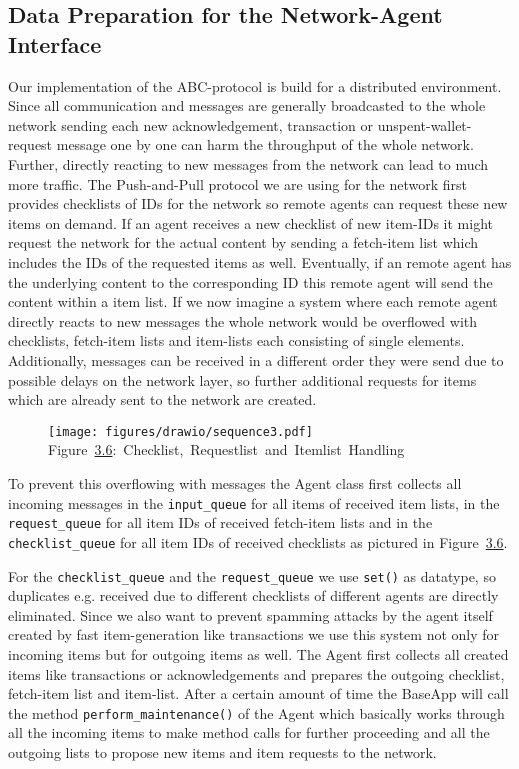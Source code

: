 \subsection{Data Preparation for the Network-Agent Interface}
\label{data_prep}
Our implementation of the ABC-protocol is build for a distributed environment. Since all communication and messages are generally broadcasted to the whole network sending each new acknowledgement, transaction or unspent-wallet-request message one by one can harm the throughput of the whole network.
Further, directly reacting to new messages from the network can lead to much more traffic. The Push-and-Pull protocol we are using for the network first provides checklists of IDs for the network so remote agents can request these new items on demand.
If an agent receives a new checklist of new item-IDs it might request the network for the actual content by sending a fetch-item list which includes the IDs of the requested items as well.
Eventually, if an remote agent has the underlying content to the corresponding ID this remote agent will send the content within a item list.
If we now imagine a system where each remote agent directly reacts to new messages the whole network would be overflowed with checklists, fetch-item lists and item-lists each consisting of single elements. Additionally, messages can be received in a different order they were send due to possible delays on the network layer, so further additional requests for items which are already sent to the network are created.

\begin{figure}[h]
	\centering
	\texttt{[image: figures/drawio/sequence3.pdf]}
    \footnotesize{Figure~\hyperref[input_queues]{3.6}:~Checklist,~Requestlist~and~Itemlist~Handling}
    \label{input_queues}
\end{figure}

To prevent this overflowing with messages the Agent class first collects all incoming messages in the \texttt{input\_queue} for all items of received item lists, in the \texttt{request\_queue} for all item IDs of received fetch-item lists and in the \texttt{checklist\_queue} for all item IDs of received checklists as pictured in Figure~\hyperref[input_queues]{3.6}.


For the \texttt{checklist\_queue} and the \texttt{request\_queue} we use \texttt{set()} as datatype, so duplicates e.g. received due to different checklists of different agents are directly eliminated.
Since we also want to prevent spamming attacks by the agent itself created by fast item-generation like transactions we use this system not only for incoming items but for outgoing items as well.
The Agent first collects all created items like transactions or acknowledgements and prepares the outgoing checklist, fetch-item list and item-list.
After a certain amount of time the BaseApp will call the method \texttt{perform\_maintenance()} of the Agent which basically works through all the incoming items to make method calls for further proceeding and all the outgoing lists to propose new items and item requests to the network.



